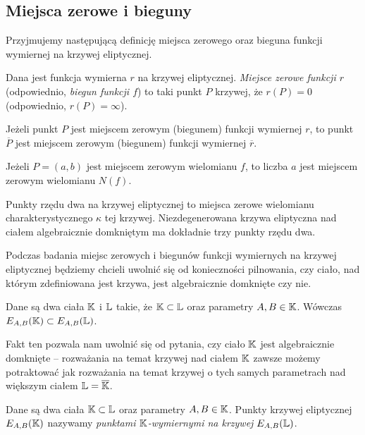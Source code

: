 \subsection*{Miejsca zerowe i bieguny}

Przyjmujemy następującą definicję
miejsca zerowego oraz bieguna funkcji wymiernej na krzywej eliptycznej.

\begin{definition}
Dana jest funkcja wymierna $r$ na krzywej eliptycznej.
\emph{Miejsce zerowe funkcji $r$} (odpowiednio, \emph{biegun funkcji $f$})
to taki punkt $P$ krzywej, że $r(P) = 0$ (odpowiednio, $r(P) = \infty$).
\end{definition}

\begin{fact}
Jeżeli punkt $P$
jest miejscem zerowym (biegunem) funkcji wymiernej $r$,
to punkt $\overline{P}$
jest miejscem zerowym (biegunem) funkcji wymiernej $\overline{r}$.
\end{fact}

\begin{corollary}\label{zero_of_norm_coro}
Jeżeli $P = (a, b)$ jest miejscem zerowym wielomianu $f$,
to liczba $a$ jest miejscem zerowym wielomianu $N(f)$.
\end{corollary}

\begin{fact}
Punkty rzędu dwa na krzywej eliptycznej
to miejsca zerowe wielomianu charakterystycznego $\kappa$ tej krzywej.
Niezdegenerowana krzywa eliptyczna nad ciałem algebraicznie domkniętym
ma dokładnie trzy punkty rzędu dwa.
\end{fact}

Podczas badania miejsc zerowych i biegunów
funkcji wymiernych na krzywej eliptycznej
będziemy chcieli uwolnić się od konieczności pilnowania,
czy ciało, nad którym zdefiniowana jest krzywa,
jest algebraicznie domknięte czy nie.

\begin{fact}
Dane są dwa ciała $\mathbb{K}$ i $\mathbb{L}$ takie, że $\mathbb{K} \subset \mathbb{L}$
oraz parametry $A,B \in \mathbb{K}$.
Wówczas $E_{A,B}(\mathbb{K}) \subset E_{A,B}(\mathbb{L})$.
\end{fact}

Fakt ten pozwala nam uwolnić się od pytania,
czy ciało $\mathbb{K}$ jest algebraicznie domknięte --
rozważania na temat krzywej nad ciałem $\mathbb{K}$
zawsze możemy potraktować
jak rozważania na temat krzywej o tych samych parametrach
nad większym ciałem $\mathbb{L} = \overline{\mathbb{K}}$.

\begin{definition}
Dane są dwa ciała $\mathbb{K} \subset \mathbb{L}$ oraz parametry $A, B \in \mathbb{K}$.
Punkty krzywej eliptycznej $E_{A,B}(\mathbb{K})$
nazywamy \emph{punktami $\mathbb{K}$-wymiernymi na krzywej $E_{A,B}(\mathbb{L})$}.
\end{definition}

